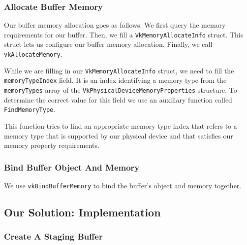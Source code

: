 \begin{minipage}{\linewidth}{\noindent}
    
\end{minipage}

\subsubsection{Allocate Buffer Memory}

Our buffer memory allocation goes as follows.
We first query the memory requirements for our buffer.
Then, we fill a \texttt{VkMemoryAllocateInfo} struct.
This struct lets us configure our buffer memory allocation.
Finally, we call \texttt{vkAllocateMemory}.

\begin{minipage}{\linewidth}{\noindent}
    
\end{minipage}

While we are filling in our \texttt{VkMemoryAllocateInfo} struct, we need to fill
the \texttt{memoryTypeIndex} field.
It is an index identifying a memory type from the \texttt{memoryTypes}
array of the \texttt{VkPhysicalDeviceMemoryProperties} structure.
To determine the correct value for this field we use an auxiliary function
called \texttt{FindMemoryType}.


This function tries to find an appropriate memory type index that
refers to a memory type
that is supported by our physical device and that satisfies our memory property
requirements.

\subsubsection{Bind Buffer Object And Memory}

We use \texttt{vkBindBufferMemory} to bind the buffer's object and memory together.

\subsection{Our Solution: Implementation}

\subsubsection{Create A Staging Buffer}

